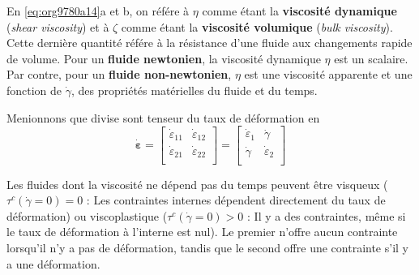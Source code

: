 \documentclass[10pt]{article}
\numberwithin{equation}{section}
\begin{document}
En \ref{eq:org9780a14}a et b, on référe à \(\eta\) comme étant la \textbf{viscosité dynamique} (\emph{shear viscosity}) et à \(\zeta\) comme étant la \textbf{viscosité volumique} (\emph{bulk viscosity}).
Cette dernière quantité référe à la résistance d'une fluide aux changements rapide de volume.
Pour un \textbf{fluide newtonien}, la viscosité dynamique \(\eta\) est un scalaire.
Par contre, pour un \textbf{fluide non-newtonien}, \(\eta\) est une viscosité apparente et une fonction de \(\dot{\gamma}\), des propriétés matérielles du fluide et du temps.

Menionnons que \Textcite{herman2022granular} divise sont tenseur du taux de déformation en
\begin{equation}
   \dot{\boldsymbol{\varepsilon}} = \begin{bmatrix}
     \dot{\varepsilon}_{11} & \dot{\varepsilon}_{12}\\
     \dot{\varepsilon}_{21} & \dot{\varepsilon}_{22} \\
   \end{bmatrix} =\begin{bmatrix}
     \dot{\varepsilon}_1 & \dot{\gamma} \\
     \dot{\gamma} & \dot{\varepsilon}_2 \\
   \end{bmatrix}
\end{equation}

Les fluides dont la viscosité ne dépend pas du temps peuvent être visqueux (\(\tau^c(\dot{\gamma} = 0) = 0\)  : Les contraintes internes dépendent directement du taux de déformation) ou viscoplastique (\(\tau^c(\dot{\gamma} = 0) > 0\) : Il y a des contraintes, même si le taux de déformation à l'interne est nul).
Le premier n'offre aucun contrainte lorsqu'il n'y a pas de déformation, tandis que le second offre une contrainte s'il y a une déformation. 

\printbibliography
\end{document}
